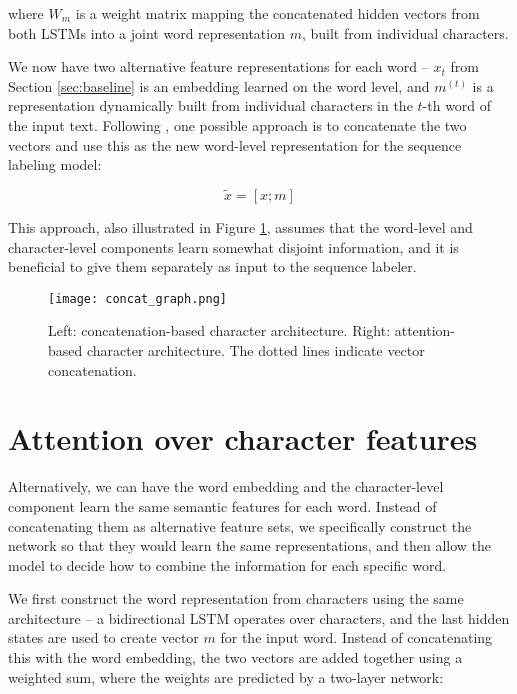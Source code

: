 \documentclass[11pt]{article}
\begin{document}
\noindent where $W_m$ is a weight matrix mapping the concatenated hidden vectors from both LSTMs into a joint word representation $m$, built from individual characters.

We now have two alternative feature representations for each word -- $x_t$ from Section \ref{sec:baseline} is an embedding learned on the word level, and $m^{(t)}$ is a representation dynamically built from individual characters in the $t$-th word of the input text. Following , one possible approach is to concatenate the two vectors and use this as the new word-level representation for the sequence labeling model:

\begin{equation}
\widetilde{x} = [x; m]
\end{equation}

\noindent This approach, also illustrated in Figure \ref{fig:char}, assumes that the word-level and character-level components learn somewhat disjoint information, and it is beneficial to give them separately as input to the sequence labeler. 



\begin{figure}[t]
    \centering
	\texttt{[image: concat\_graph.png]}
	\caption{Left: concatenation-based character architecture. Right: attention-based character architecture. The dotted lines indicate vector concatenation.}
	\label{fig:char}
\end{figure}



\section{Attention over character features}
\label{sec:attn}

Alternatively, we can have the word embedding and the character-level component learn the same semantic features for each word. Instead of concatenating them as alternative feature sets, we specifically construct the network so that they would learn the same representations, and then allow the model to decide how to combine the information for each specific word.

We first construct the word representation from characters using the same architecture -- a bidirectional LSTM operates over characters, and the last hidden states are used to create vector $m$ for the input word. Instead of concatenating this with the word embedding, the two vectors are added together using a weighted sum, where the weights are predicted by a two-layer network:
\end{document}
